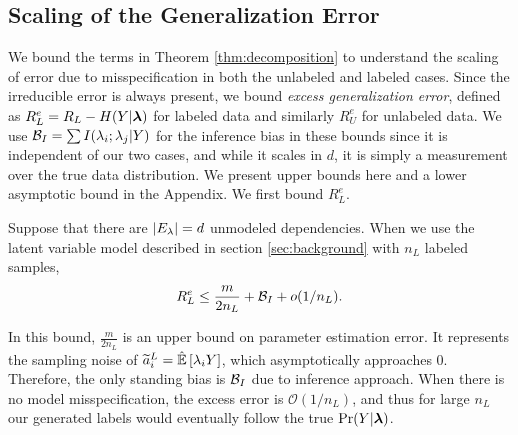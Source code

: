 
\subsection{Scaling of the Generalization Error} %
\label{subsec:scaling}
\vspace{-0.5em}

We bound the terms in Theorem \ref{thm:decomposition} to understand the scaling of error due to misspecification in both the unlabeled and labeled cases. Since the irreducible error is always present, we bound \textit{excess generalization error}, defined as $R^{e}_L = R_L -  H(Y|\bm{\lambda})$ for labeled data and similarly $R^{e}_U$ for unlabeled data.  We use $\mathcal{B}_I = \sum I(\lambda_i; \lambda_j | Y)$ for the inference bias in these bounds since it is independent of our two cases, and while it scales in $d$, it is simply a measurement over the true data distribution. We present upper bounds here and a lower asymptotic bound in the Appendix. 
We first bound $R^{e}_L$. 
\begin{theorem}
Suppose that there are $|E_{\lambda}| = d$ unmodeled dependencies. When we use the latent variable model described in section \ref{sec:background} with $n_L$ labeled samples,
\begin{align}
   R_L^{e} \le \frac{m}{2n_L} + \mathcal{B}_I + o(1/n_L).
\end{align}
\label{thm:labeled}
\end{theorem}

In this bound, $\frac{m}{2n_L}$ is an upper bound on parameter estimation error. It represents the sampling noise of $\widetilde{a}_i^L = \hat{\mathbb{E}}\left[\lambda_i Y\right]$, which asymptotically approaches $0$. %
Therefore, the only standing bias is $\mathcal{B}_I$ due to inference approach. When there is no model misspecification, the excess error is $\mathcal{O}(1/n_L)$, and thus for large $n_L$ our generated labels would eventually follow the true $\Pr(Y | \bm{\lambda})$.  

